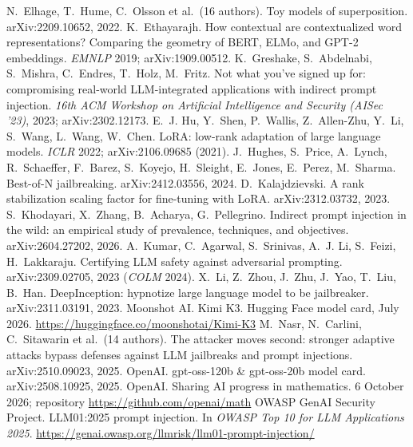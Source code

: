  N.~Elhage, T.~Hume, C.~Olsson et al.\ (16 authors). Toy models of superposition. arXiv:2209.10652, 2022.
 K.~Ethayarajh. How contextual are contextualized word representations? Comparing the geometry of BERT, ELMo, and GPT-2 embeddings. \emph{EMNLP} 2019; arXiv:1909.00512.
 K.~Greshake, S.~Abdelnabi, S.~Mishra, C.~Endres, T.~Holz, M.~Fritz. Not what you've signed up for: compromising real-world LLM-integrated applications with indirect prompt injection. \emph{16th ACM Workshop on Artificial Intelligence and Security (AISec '23)}, 2023; arXiv:2302.12173.
 E.~J. Hu, Y.~Shen, P.~Wallis, Z.~Allen-Zhu, Y.~Li, S.~Wang, L.~Wang, W.~Chen. LoRA: low-rank adaptation of large language models. \emph{ICLR} 2022; arXiv:2106.09685 (2021).
 J.~Hughes, S.~Price, A.~Lynch, R.~Schaeffer, F.~Barez, S.~Koyejo, H.~Sleight, E.~Jones, E.~Perez, M.~Sharma. Best-of-N jailbreaking. arXiv:2412.03556, 2024.
 D.~Kalajdzievski. A rank stabilization scaling factor for fine-tuning with LoRA. arXiv:2312.03732, 2023.
 S.~Khodayari, X.~Zhang, B.~Acharya, G.~Pellegrino. Indirect prompt injection in the wild: an empirical study of prevalence, techniques, and objectives. arXiv:2604.27202, 2026.
 A.~Kumar, C.~Agarwal, S.~Srinivas, A.~J. Li, S.~Feizi, H.~Lakkaraju. Certifying LLM safety against adversarial prompting. arXiv:2309.02705, 2023 (\emph{COLM} 2024).
 X.~Li, Z.~Zhou, J.~Zhu, J.~Yao, T.~Liu, B.~Han. DeepInception: hypnotize large language model to be jailbreaker. arXiv:2311.03191, 2023.
 Moonshot AI. Kimi K3. Hugging Face model card, July 2026. \url{https://huggingface.co/moonshotai/Kimi-K3}
 M.~Nasr, N.~Carlini, C.~Sitawarin et al.\ (14 authors). The attacker moves second: stronger adaptive attacks bypass defenses against LLM jailbreaks and prompt injections. arXiv:2510.09023, 2025.
 OpenAI. gpt-oss-120b \& gpt-oss-20b model card. arXiv:2508.10925, 2025.
 OpenAI. Sharing AI progress in mathematics. 6 October 2026; repository \url{https://github.com/openai/math}
 OWASP GenAI Security Project. LLM01:2025 prompt injection. In \emph{OWASP Top 10 for LLM Applications 2025}. \url{https://genai.owasp.org/llmrisk/llm01-prompt-injection/}
